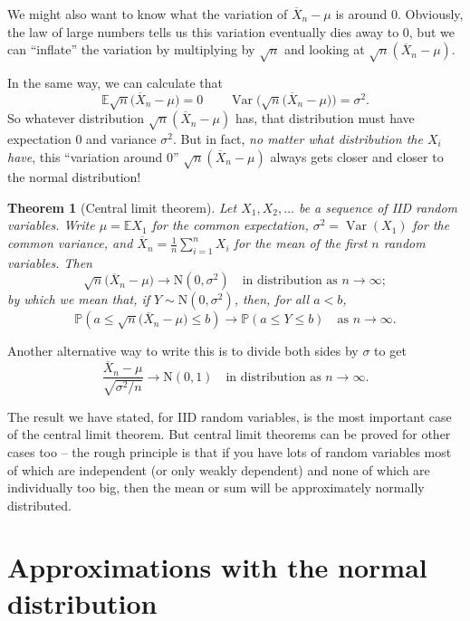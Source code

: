 \documentclass[
  a4paper,
]{book}
\newtheorem{theorem}{Theorem}[chapter]
\theoremstyle{definition}
\theoremstyle{definition}
\theoremstyle{definition}
\theoremstyle{definition}
\theoremstyle{remark}
\begin{document}
We might also want to know what the variation of \(\overline X_n - \mu\) is around 0. Obviously, the law of large numbers tells us this variation eventually dies away to 0, but we can ``inflate'' the variation by multiplying by \(\sqrt{n}\) and looking at \(\sqrt{n}(\overline X_n - \mu)\).

In the same way, we can calculate that
\[ \mathbb E\sqrt{n}\big( \overline X_n - \mu\big) = 0 \qquad \operatorname{Var}\Big(\sqrt{n}\big( \overline X_n - \mu\big)\Big) = \sigma^2. \]
So whatever distribution \(\sqrt{n}(\overline X_n - \mu)\) has, that distribution must have expectation \(0\) and variance \(\sigma^2\). But in fact, \emph{no matter what distribution the \(X_i\) have}, this ``variation around 0'' \(\sqrt{n}(\overline X_n - \mu)\) always gets closer and closer to the normal distribution!

\begin{theorem}[Central limit theorem]
\protect\hypertarget{thm:thLLN}{}\label{thm:thLLN}Let \(X_1, X_2, \dots\) be a sequence of IID random variables. Write \(\mu = \mathbb EX_1\) for the common expectation, \(\sigma^2 = \operatorname{Var}(X_1)\) for the common variance, and \(\overline X_n =\frac{1}{n} \sum_{i=1}^n X_i\) for the mean of the first \(n\) random variables. Then
\[ \sqrt{n}\big(\overline X_n - \mu\big) \to \mathrm N(0, \sigma^2) \quad \text{in distribution as $n \to \infty$}; \]
by which we mean that, if \(Y \sim \mathrm N(0, \sigma^2)\), then, for all \(a < b\),
\[ \mathbb P\left(a \leq \sqrt{n}\big(\overline X_n - \mu\big) \leq b \right) \to \mathbb P(a \leq Y \leq b) \quad \text{as $n\to\infty$.} \]
\end{theorem}

Another alternative way to write this is to divide both sides by \(\sigma\) to get
\[ \frac{\overline X_n - \mu}{\sqrt{\sigma^2/n}} \to \mathrm N(0, 1) \quad \text{in distribution as $n \to \infty$}. \]

The result we have stated, for IID random variables, is the most important case of the central limit theorem. But central limit theorems can be proved for other cases too -- the rough principle is that if you have lots of random variables most of which are independent (or only weakly dependent) and none of which are individually too big, then the mean or sum will be approximately normally distributed.

\hypertarget{normal-approx}{%
\section{Approximations with the normal distribution}\label{normal-approx}}
\end{document}

